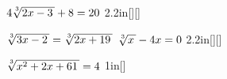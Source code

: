 

{
    $4\myRoot[3]{2x-3} + 8 = 20$
}{2.2in}[\raggedleft{}][\raggedleft{}]




\myProblems
{
    $\myRoot[3]{3x-2}  = \myRoot[3]{2x+19}$
}
{
    $\myRoot[3]{x} - 4x = 0$
}{2.2in}[\raggedleft{}][\raggedleft{}]




\myWideProblem
{
    $\myRoot[3]{x^2 + 2x + 61 } = 4$
}{1in}[\raggedleft{}]
